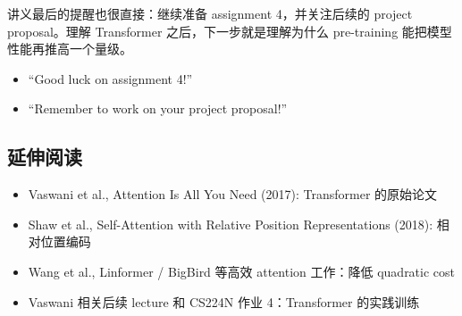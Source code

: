 讲义最后的提醒也很直接：继续准备 assignment 4，并关注后续的 project proposal。理解 Transformer 之后，下一步就是理解为什么 pre-training 能把模型性能再推高一个量级。

\begin{itemize}
    \item ``Good luck on assignment 4!''
    \item ``Remember to work on your project proposal!''
\end{itemize}

\subsection{延伸阅读}

\begin{itemize}
    \item Vaswani et al., Attention Is All You Need (2017): Transformer 的原始论文
    \item Shaw et al., Self-Attention with Relative Position Representations (2018): 相对位置编码
    \item Wang et al., Linformer / BigBird 等高效 attention 工作：降低 quadratic cost
    \item Vaswani 相关后续 lecture 和 CS224N 作业 4：Transformer 的实践训练
\end{itemize}


